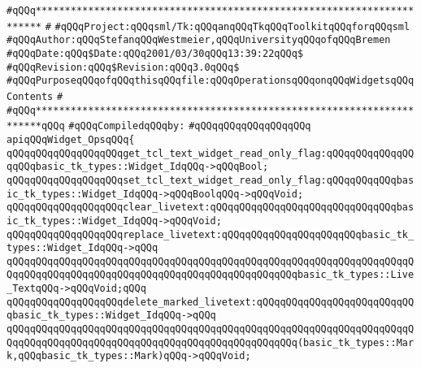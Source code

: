 \label{src/lib/tk/src/widget_ops.api}
\verb|#qQQq***********************************************************************|\newline
\verb|#|\newline
\verb|#qQQqProject:qQQqsml/Tk:qQQqanqQQqTkqQQqToolkitqQQqforqQQqsml|\newline
\verb|#qQQqAuthor:qQQqStefanqQQqWestmeier,qQQqUniversityqQQqofqQQqBremen|\newline
\verb|#qQQqDate:qQQq$Date:qQQq2001/03/30qQQq13:39:22qQQq$|\newline
\verb|#qQQqRevision:qQQq$Revision:qQQq3.0qQQq$|\newline
\verb|#qQQqPurposeqQQqofqQQqthisqQQqfile:qQQqOperationsqQQqonqQQqWidgetsqQQqContents|\newline
\verb|#|\newline
\verb|#qQQq***********************************************************************qQQq|\newline
\newline
\verb|#qQQqCompiledqQQqby:|\newline
\verb|#qQQqqQQqqQQqqQQqqQQq|\newline
\newline
\verb|apiqQQqWidget_OpsqQQq{|\newline
\newline
\verb|qQQqqQQqqQQqqQQqqQQqget_tcl_text_widget_read_only_flag:qQQqqQQqqQQqqQQqqQQqbasic_tk_types::Widget_IdqQQq->qQQqBool;|\newline
\verb|qQQqqQQqqQQqqQQqqQQqset_tcl_text_widget_read_only_flag:qQQqqQQqqQQqbasic_tk_types::Widget_IdqQQq->qQQqBoolqQQq->qQQqVoid;|\newline
\newline
\verb|qQQqqQQqqQQqqQQqqQQqclear_livetext:qQQqqQQqqQQqqQQqqQQqqQQqqQQqqQQqbasic_tk_types::Widget_IdqQQq->qQQqVoid;|\newline
\verb|qQQqqQQqqQQqqQQqqQQqreplace_livetext:qQQqqQQqqQQqqQQqqQQqqQQqbasic_tk_types::Widget_IdqQQq->qQQq|\newline
\verb|qQQqqQQqqQQqqQQqqQQqqQQqqQQqqQQqqQQqqQQqqQQqqQQqqQQqqQQqqQQqqQQqqQQqqQQqqQQqqQQqqQQqqQQqqQQqqQQqqQQqqQQqqQQqqQQqqQQqqQQqbasic_tk_types::Live_TextqQQq->qQQqVoid;qQQq|\newline
\verb|qQQqqQQqqQQqqQQqqQQqdelete_marked_livetext:qQQqqQQqqQQqqQQqqQQqqQQqqQQqbasic_tk_types::Widget_IdqQQq->qQQq|\newline
\verb|qQQqqQQqqQQqqQQqqQQqqQQqqQQqqQQqqQQqqQQqqQQqqQQqqQQqqQQqqQQqqQQqqQQqqQQqqQQqqQQqqQQqqQQqqQQqqQQqqQQqqQQqqQQqqQQqqQQqqQQq(basic_tk_types::Mark,qQQqbasic_tk_types::Mark)qQQq->qQQqVoid;|\newline
